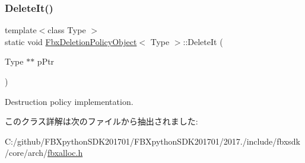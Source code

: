 \subsubsection{\texorpdfstring{Delete\+It()}{DeleteIt()}}
{\footnotesize\ttfamily template$<$class Type $>$ \\
static void \hyperlink{class_fbx_deletion_policy_object}{Fbx\+Deletion\+Policy\+Object}$<$ Type $>$\+::Delete\+It (\begin{DoxyParamCaption}\item[{Type $\ast$$\ast$}]{p\+Ptr }\end{DoxyParamCaption})\hspace{0.3cm}{\ttfamily [static]}}



Destruction policy implementation. 



このクラス詳解は次のファイルから抽出されました\+:\begin{DoxyCompactItemize}
\item 
C\+:/github/\+F\+B\+Xpython\+S\+D\+K201701/\+F\+B\+Xpython\+S\+D\+K201701/2017./include/fbxsdk/core/arch/\hyperlink{fbxalloc_8h}{fbxalloc.\+h}\end{DoxyCompactItemize}
